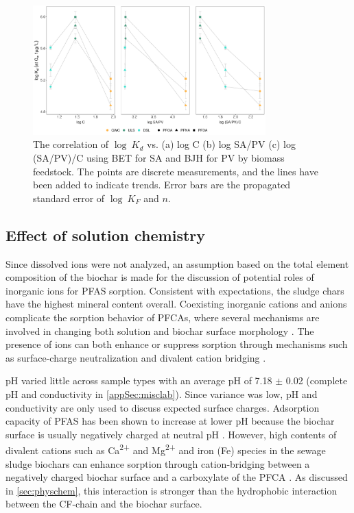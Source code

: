 \begin{figure}[htb]
    \centering
    \includegraphics[width=0.8\textwidth]{R/figs/SAPV_C_Kd1ugL_plot.pdf}
    \caption{The correlation of $\log~K_d$ vs. (a) log C (b) log SA/PV (c) log (SA/PV)/C using BET for SA and BJH for PV by biomass feedstock. The points are discrete measurements, and the lines have been added to indicate trends. Error bars are the propagated standard error of $\log~K_F$ and $n$.}
    \label{fig:Kd_SAPV_C}
\end{figure}

\subsection{Effect of solution chemistry}\label{sec:inorganic}

Since dissolved ions were not analyzed, an assumption based on the total element composition of the biochar is made for the discussion of potential roles of inorganic ions for PFAS sorption. Consistent with expectations, the sludge chars have the highest mineral content overall. Coexisting inorganic cations and anions complicate the sorption behavior of PFCAs, where several mechanisms are involved in changing both solution and biochar surface morphology \citep{du2014adsorption}. The presence of ions can both enhance or suppress sorption through mechanisms such as surface-charge neutralization and divalent cation bridging \citep{du2014adsorption}.

pH varied little across sample types with an average pH of 7.18 $\pm$ 0.02 (complete pH and conductivity in \cref{appSec:misclab}). Since variance was low, pH and conductivity are only used to discuss expected surface charges. Adsorption capacity of PFAS has been shown to increase at lower pH because the biochar surface is usually negatively charged at neutral pH \citep{zhang2013sorption}. However, high contents of divalent cations such as Ca\textsuperscript{2+} and Mg\textsuperscript{2+} and iron (Fe) species in the sewage sludge biochars can enhance sorption through cation-bridging between a negatively charged biochar surface and a carboxylate of the PFCA \citep{sigmund2022sorption}. As discussed in \cref{sec:physchem}, this interaction is stronger than the hydrophobic interaction between the CF-chain and the biochar surface.

